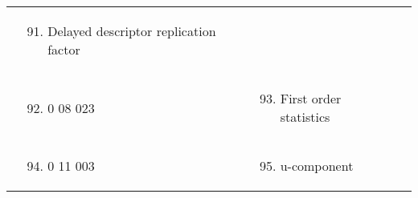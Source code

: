 \begin{longtable}[]{@{}llll@{}}
\begin{minipage}[t]{0.22\columnwidth}
\end{minipage} & \begin{minipage}[t]{0.22\columnwidth}\raggedright
\begin{enumerate}
\setcounter{enumi}{90}
\item
  Delayed descriptor replication factor
\end{enumerate}\strut
\end{minipage} & \begin{minipage}[t]{0.22\columnwidth}\raggedright
\strut
\end{minipage}\tabularnewline
\begin{minipage}[t]{0.22\columnwidth}\raggedright
\strut
\end{minipage} & \begin{minipage}[t]{0.22\columnwidth}\raggedright
\begin{enumerate}
\setcounter{enumi}{91}
\item
  0 08 023
\end{enumerate}\strut
\end{minipage} & \begin{minipage}[t]{0.22\columnwidth}\raggedright
\begin{enumerate}
\setcounter{enumi}{92}
\item
  First order statistics
\end{enumerate}\strut
\end{minipage} & \begin{minipage}[t]{0.22\columnwidth}\raggedright
\strut
\end{minipage}\tabularnewline
\begin{minipage}[t]{0.22\columnwidth}\raggedright
\strut
\end{minipage} & \begin{minipage}[t]{0.22\columnwidth}\raggedright
\begin{enumerate}
\setcounter{enumi}{93}
\item
  0 11 003
\end{enumerate}\strut
\end{minipage} & \begin{minipage}[t]{0.22\columnwidth}\raggedright
\begin{enumerate}
\setcounter{enumi}{94}
\item
  u-component
\end{enumerate}\strut
\end{minipage} & \begin{minipage}[t]{0.22\columnwidth}\raggedright
\strut
\end{minipage}\tabularnewline

\end{longtable}
